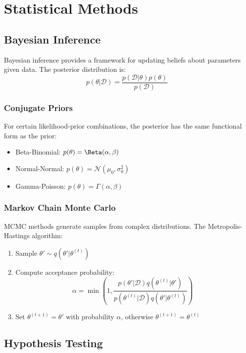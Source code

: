 \documentclass{article}
\begin{document}
\section{Statistical Methods}

\subsection{Bayesian Inference}

Bayesian inference provides a framework for updating beliefs about
parameters given data. The posterior distribution is:
\[
p(\theta|\mathcal{D}) = \frac{p(\mathcal{D}|\theta) p(\theta)}{p(\mathcal{D})}
\]

\subsubsection{Conjugate Priors}

For certain likelihood-prior combinations, the posterior has the same
functional form as the prior:

\begin{itemize}
\item Beta-Binomial: $p(\theta) = \Beta(\alpha, \beta)$
\item Normal-Normal: $p(\theta) = \mathcal{N}(\mu_0, \sigma_0^2)$
\item Gamma-Poisson: $p(\theta) = \Gamma(\alpha, \beta)$
\end{itemize}

\subsubsection{Markov Chain Monte Carlo}

MCMC methods generate samples from complex distributions. The Metropolis-Hastings
algorithm:

\begin{enumerate}
\item Sample $\theta' \sim q(\theta'|\theta^{(t)})$
\item Compute acceptance probability:
\[
\alpha = \min\left(1, \frac{p(\theta'|\mathcal{D}) q(\theta^{(t)}|\theta')}{p(\theta^{(t)}|\mathcal{D}) q(\theta'|\theta^{(t)})}\right)
\]
\item Set $\theta^{(t+1)} = \theta'$ with probability $\alpha$, otherwise $\theta^{(t+1)} = \theta^{(t)}$
\end{enumerate}

\subsection{Hypothesis Testing}
\end{document}
